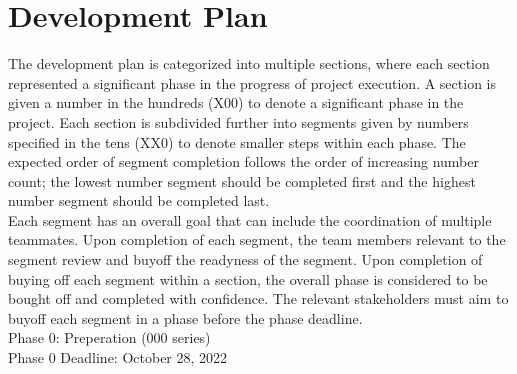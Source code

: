 \documentclass[12pt]{article}
\begin{document}
\section{Development Plan}

The development plan is categorized into multiple sections, where each section represented a significant phase in the progress of project execution. A section is given a number in the hundreds (X00) to denote a significant phase in the project. Each section is subdivided further into segments given by numbers specified in the tens (XX0) to denote smaller steps within each phase. The expected order of segment completion follows the order of increasing number count; the lowest number segment should be completed first and the highest number segment should be completed last.\\

Each segment has an overall goal that can include the coordination of multiple teammates. Upon completion of each segment, the team members relevant to the segment review and buyoff the readyness of the segment. Upon completion of buying off each segment within a section, the overall phase is considered to be bought off and completed with confidence. The relevant stakeholders must aim to buyoff each segment in a phase before the phase deadline.\\


\noindent
Phase 0: Preperation (000 series)\\
Phase 0 Deadline: October 28, 2022\\
\end{document}
